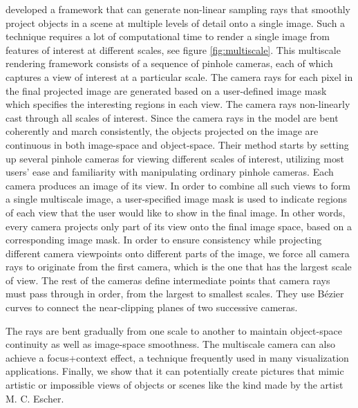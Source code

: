  \cite{Hsu:2011:RFM:2070781.2024165} developed a framework that can generate non-linear sampling rays that smoothly project objects in a scene at multiple levels of detail onto a single image. Such a technique requires a lot of computational time to render a single image from features of interest at different scales, see figure \ref{fig:multiscale}. This multiscale rendering framework consists of a sequence of pinhole cameras, each of which captures a view of interest at a particular scale. The camera rays for each pixel in the final projected image are generated based on a user-defined image mask which specifies the interesting regions in each view.  The camera rays non-linearly cast through all scales of interest. Since the camera rays in the model are bent coherently and march consistently, the objects projected on the image are continuous in both image-space and object-space. 
 Their method starts by setting up several pinhole cameras for viewing different scales of interest, utilizing most users’ ease and familiarity with manipulating ordinary pinhole cameras. Each camera produces an image of its view. In order to combine all such views to form a single multiscale image, a user-specified image mask is used to indicate regions of each view that the user would like to show in the final image. In other words, every camera projects only part of its view onto the final image space, based on a corresponding image mask. In order to ensure consistency while projecting different camera
viewpoints onto different parts of the image, we force all camera rays to originate from the first camera, which is the one that has the largest scale of view. The rest of the cameras define intermediate
points that camera rays must pass through in order, from the largest to smallest scales. They use B\'ezier curves to connect the near-clipping planes of two successive cameras.

  The rays are bent gradually from one scale to another to maintain object-space continuity as well as image-space smoothness. The multiscale camera can also achieve a focus+context effect, a technique frequently used in many visualization applications. Finally, we show that it can potentially create pictures that mimic artistic or impossible views of objects or scenes like the kind made by the artist M. C. Escher. 
 
